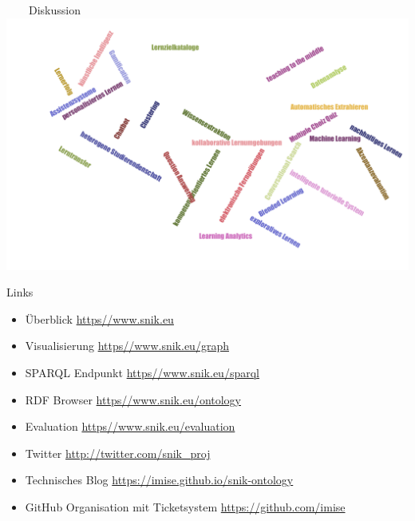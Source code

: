 \documentclass[aspectratio=1610,12pt]{beamer}
\newcommand{\imageslide}[4][]
{
\newgeometry{margin=0cm,top=1em}
\begin{frame}[plain]{~~~~#2}
\vspace{0.2em}
\centering\texttt{[image: \#3]}
\\#1
\note{#4}
\end{frame}
\restoregeometry
}
\begin{document}
{
\begin{frame}[plain]{~~~~Diskussion}
\vspace{-1em}
\hspace{-5em}
\centering\includegraphics[width=1.2\textwidth,height=1.1\textheight,keepaspectratio]{img/diskussion.pdf}
\end{frame}
\restoregeometry
}


\begin{frame}[fragile]{Links}
\begin{itemize}
\vspace{0.5em}%
\item Überblick \url{https//www.snik.eu}
\item Visualisierung \url{https//www.snik.eu/graph}
\item SPARQL Endpunkt \url{https//www.snik.eu/sparql}
\item RDF Browser \url{https//www.snik.eu/ontology}
\item Evaluation \url{https//www.snik.eu/evaluation}
\item Twitter \url{http://twitter.com/snik\_proj}
\item Technisches Blog \url{https://imise.github.io/snik-ontology}
\item GitHub Organisation mit Ticketsystem \url{https://github.com/imise}
\end{itemize}
\end{frame}
\end{document}
